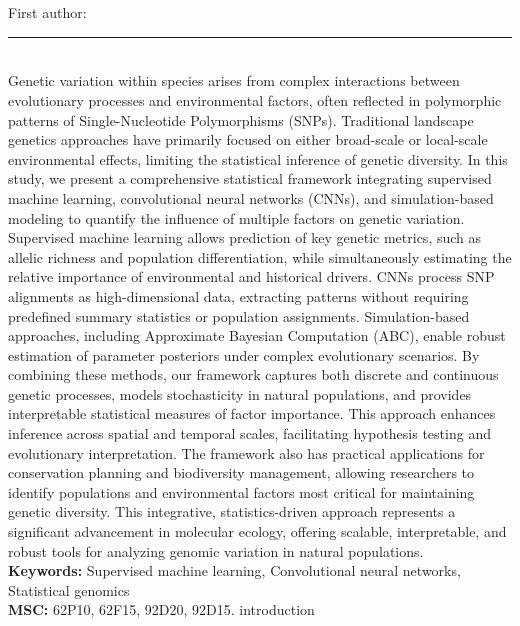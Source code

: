 \documentclass[10pt,twoside]{article}
\begin{document}
\noindent\begin{minipage}[t][\textheight]{\textwidth}
\\[0.35em]
{\itshape }\\[0.2em]
{\footnotesize First author: }\\[0.45em]
\noindent\rule{\textwidth}{0.3pt}\\[0.4em]
{\footnotesize Genetic variation within species arises from complex interactions between evolutionary processes and environmental factors, often reflected in polymorphic patterns of Single-Nucleotide Polymorphisms (SNPs). Traditional landscape genetics approaches have primarily focused on either broad-scale or local-scale environmental effects, limiting the statistical inference of genetic diversity. In this study, we present a comprehensive statistical framework integrating supervised machine learning, convolutional neural networks (CNNs), and simulation-based modeling to quantify the influence of multiple factors on genetic variation. Supervised machine learning allows prediction of key genetic metrics, such as allelic richness and population differentiation, while simultaneously estimating the relative importance of environmental and historical drivers. CNNs process SNP alignments as high-dimensional data, extracting patterns without requiring predefined summary statistics or population assignments. Simulation-based approaches, including Approximate Bayesian Computation (ABC), enable robust estimation of parameter posteriors under complex evolutionary scenarios. By combining these methods, our framework captures both discrete and continuous genetic processes, models stochasticity in natural populations, and provides interpretable statistical measures of factor importance. This approach enhances inference across spatial and temporal scales, facilitating hypothesis testing and evolutionary interpretation. The framework also has practical applications for conservation planning and biodiversity management, allowing researchers to identify populations and environmental factors most critical for maintaining genetic diversity. This integrative, statistics-driven approach represents a significant advancement in molecular ecology, offering scalable, interpretable, and robust tools for analyzing genomic variation in natural populations.}\\[0.4em]
{\footnotesize\bfseries Keywords:} {\footnotesize Supervised machine learning, Convolutional neural networks, Statistical genomics}\\[0.15em]
{\footnotesize\bfseries MSC:} {\footnotesize 62P10, 62F15, 92D20, 92D15. introduction}\\
\vfill
\end{minipage}
\newpage
\end{document}
